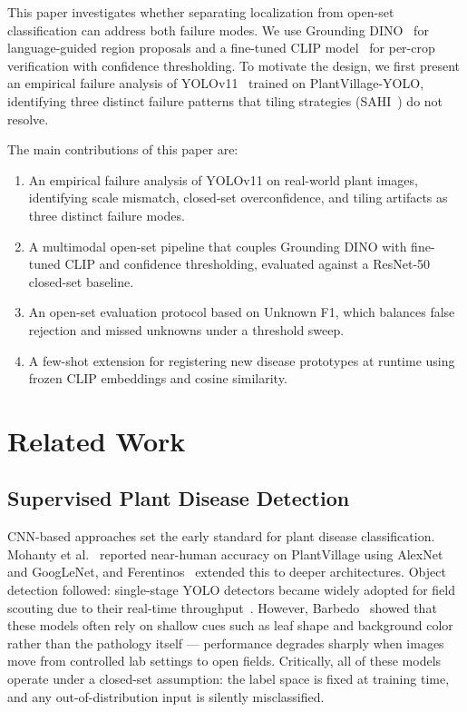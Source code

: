 \documentclass[runningheads]{llncs}
\begin{document}
This paper investigates whether separating localization from open-set classification can address both failure modes. We use Grounding DINO~\cite{liu2023grounding} for language-guided region proposals and a fine-tuned CLIP model~\cite{radford2021learning} for per-crop verification with confidence thresholding. To motivate the design, we first present an empirical failure analysis of YOLOv11~\cite{jocher2024ultralytics} trained on PlantVillage-YOLO, identifying three distinct failure patterns that tiling strategies (SAHI~\cite{wang2022sahi}) do not resolve.

The main contributions of this paper are:
\begin{enumerate}
    \item An empirical failure analysis of YOLOv11 on real-world plant images, identifying scale mismatch, closed-set overconfidence, and tiling artifacts as three distinct failure modes.
    \item A multimodal open-set pipeline that couples Grounding DINO with fine-tuned CLIP and confidence thresholding, evaluated against a ResNet-50 closed-set baseline.
    \item An open-set evaluation protocol based on Unknown F1, which balances false rejection and missed unknowns under a threshold sweep.
    \item A few-shot extension for registering new disease prototypes at runtime using frozen CLIP embeddings and cosine similarity.
\end{enumerate}

\section{Related Work}

\subsection{Supervised Plant Disease Detection}
CNN-based approaches set the early standard for plant disease classification. Mohanty et al.~\cite{mohanty2016using} reported near-human accuracy on PlantVillage using AlexNet and GoogLeNet, and Ferentinos~\cite{ferentinos2018deep} extended this to deeper architectures. Object detection followed: single-stage YOLO detectors became widely adopted for field scouting due to their real-time throughput~\cite{li2021comprehensive}. However, Barbedo~\cite{barbedo2018impact} showed that these models often rely on shallow cues such as leaf shape and background color rather than the pathology itself --- performance degrades sharply when images move from controlled lab settings to open fields. Critically, all of these models operate under a closed-set assumption: the label space is fixed at training time, and any out-of-distribution input is silently misclassified.
\end{document}
